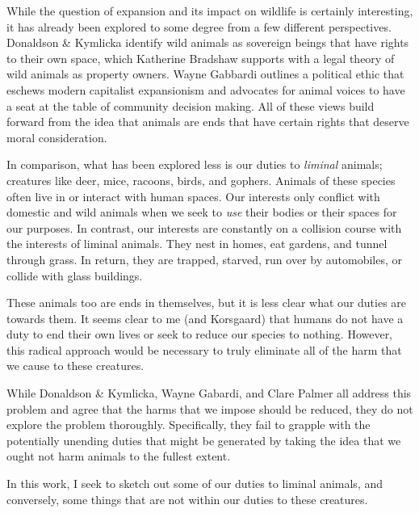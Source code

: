 		While the question of expansion and its impact on wildlife is certainly
		interesting, it has already been explored to some degree from a few
		different perspectives. Donaldson \& Kymlicka identify wild animals as
		sovereign beings that have rights to their own space, which Katherine
		Bradshaw supports with a legal theory of wild animals as property
		owners. Wayne Gabbardi outlines a political ethic that eschews modern
		capitalist expansionism and advocates for animal voices to have a seat
		at the table of community decision making. All of these views build
		forward from the idea that animals are ends that have certain rights
		that deserve moral consideration.

		In comparison, what has been explored less is our duties to
		\emph{liminal} animals; creatures like deer, mice, racoons, birds,
		and gophers.  Animals of these species often live in or interact with
		human spaces.  Our interests only conflict with domestic and wild
		animals when we seek to \emph{use} their bodies or their spaces for our
		purposes. In contrast, our interests are constantly on a collision
		course with the interests of liminal animals. They nest in homes, eat
		gardens, and tunnel through grass. In return, they are trapped,
		starved, run over by automobiles, or collide with glass buildings.

		These animals too are ends in themselves, but it is less clear what our
		duties are towards them. It seems clear to me (and
		Korsgaard)\autocite[11.9]{korsgaard_fellow_creatures} that humans do
		not have a duty to end their own lives or seek to reduce our species to
		nothing. However, this radical approach would be necessary to truly
		eliminate all of the harm
		that we cause to these creatures.

		While Donaldson \& Kymlicka, Wayne Gabardi, and Clare Palmer all
		address this problem and agree that the harms that we impose should be
		reduced, they do not explore the problem thoroughly.  Specifically,
		they fail to grapple with the potentially unending duties that might be
		generated by taking the idea that we ought not harm animals to the
		fullest extent.

		In this work, I seek to sketch out some of our duties to liminal
		animals, and conversely, some things that are not within our duties to
		these creatures.
